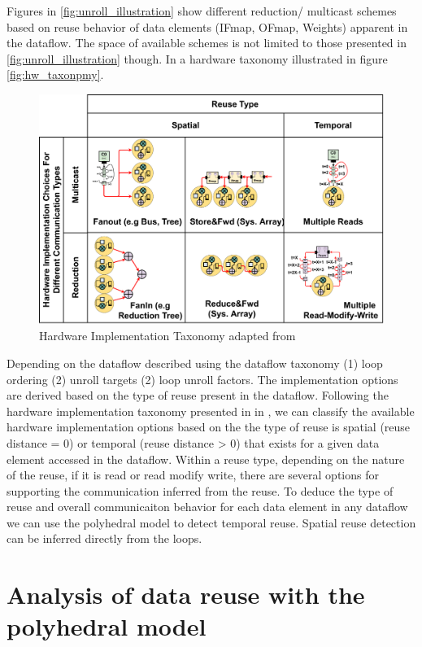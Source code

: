 Figures in \autoref{fig:unroll_illustration} show different reduction/ multicast
schemes based on reuse behavior of data elements (IFmap, OFmap, Weights)
apparent in the dataflow. The space of available schemes is not limited to those
presented in \autoref{fig:unroll_illustration} though. In \cite{maestro} a
hardware taxonomy illustrated in figure \autoref{fig:hw_taxonpmy}.

\begin{figure}[ht]
    \centering
    \includegraphics[scale=0.58]{fig/hw_taxonomy.pdf}
    \caption{Hardware Implementation Taxonomy adapted from \cite{maestro}}
    \label{fig:hw_taxonomy}
\end{figure}


Depending on the dataflow described using the dataflow taxonomy (1) loop
ordering (2) unroll targets (2) loop unroll factors. The implementation options
are derived based on the type of reuse present in the dataflow. Following the
hardware implementation taxonomy presented in in \cite{maestro}, we can classify
the available hardware implementation options based on the the type of reuse is
spatial (reuse distance = 0) or temporal (reuse distance > 0) that exists for a
given data element accessed in the dataflow. Within a reuse type, depending on
the nature of the reuse, if it is read or read modify write, there are several
options for supporting the communication inferred from the reuse. To deduce the
type of reuse and overall communicaiton behavior for each data element in any
dataflow we can use the polyhedral model to detect temporal reuse. Spatial reuse
detection can be inferred directly from the loops.


\section{Analysis of data reuse with the polyhedral model}

